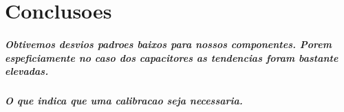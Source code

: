 \documentclass[12pt,twoside, a4paper, twocolumn]{article}
\begin{document}
\section{Conclusoes}

\subparagraph*{Obtivemos desvios padroes baixos para nossos componentes. Porem espeficiamente no caso dos capacitores as tendencias foram bastante elevadas.}

\subparagraph*{O que indica que uma calibracao seja necessaria.}
\end{document}

